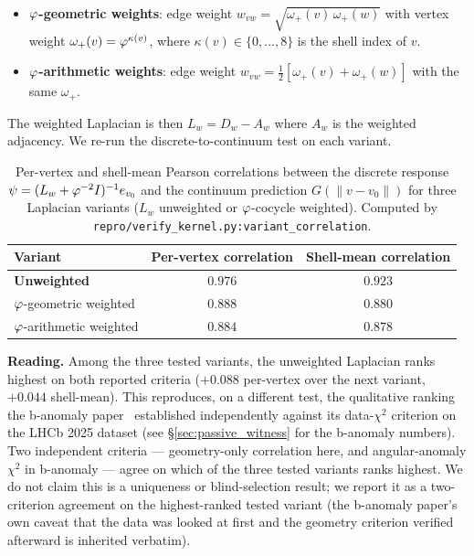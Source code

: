 \begin{itemize}\itemsep=2pt
\item \textbf{$\varphi$-geometric weights}: edge weight
  $w_{vw} = \sqrt{\omega_{+}(v)\,\omega_{+}(w)}$ with vertex weight
  $\omega_{+}(v) = \varphi^{\kappa(v)}$, where $\kappa(v) \in \{0,\ldots,8\}$
  is the shell index of $v$.
\item \textbf{$\varphi$-arithmetic weights}: edge weight
  $w_{vw} = \tfrac12[\omega_{+}(v) + \omega_{+}(w)]$ with the same
  $\omega_{+}$.
\end{itemize}
The weighted Laplacian is then
$L_{w} = D_{w} - A_{w}$ where $A_{w}$ is the weighted adjacency.
We re-run the discrete-to-continuum test on each variant.

\begin{table}[ht]
\centering
\small
\caption{Per-vertex and shell-mean Pearson correlations between the
discrete response $\psi = (L_{w} + \varphi^{-2} I)^{-1} e_{v_{0}}$
and the continuum prediction $G(\|v - v_{0}\|)$ for three
Laplacian variants ($L_{w}$ unweighted or $\varphi$-cocycle weighted).
Computed by \texttt{repro/verify\_kernel.py:variant\_correlation}.}
\label{tab:variant_correlation}
\begin{tabular}{l c c}
\toprule
Variant            & Per-vertex correlation & Shell-mean correlation \\
\midrule
\textbf{Unweighted}     & $\mathbf{0.976}$ & $\mathbf{0.923}$ \\
$\varphi$-geometric weighted    & $0.888$  & $0.880$ \\
$\varphi$-arithmetic weighted   & $0.884$  & $0.878$ \\
\bottomrule
\end{tabular}
\end{table}

\textbf{Reading.} Among the three tested variants, the unweighted
Laplacian ranks highest on both reported criteria
($+0.088$ per-vertex over the next variant, $+0.044$ shell-mean).
This reproduces, on a different test, the qualitative ranking the
b-anomaly paper~\citep{SmartBAnomaly2026} established
independently against its data-$\chi^{2}$ criterion
on the LHCb 2025 dataset (see \S\ref{sec:passive_witness} for the
b-anomaly numbers). Two independent criteria — geometry-only
correlation here, and angular-anomaly $\chi^{2}$ in b-anomaly —
agree on which of the three tested variants ranks highest. We do not claim
this is a uniqueness or blind-selection result; we report it as a
two-criterion agreement on the highest-ranked tested variant (the
b-anomaly paper's own caveat that the data was looked at first
and the geometry criterion verified afterward is inherited
verbatim).

